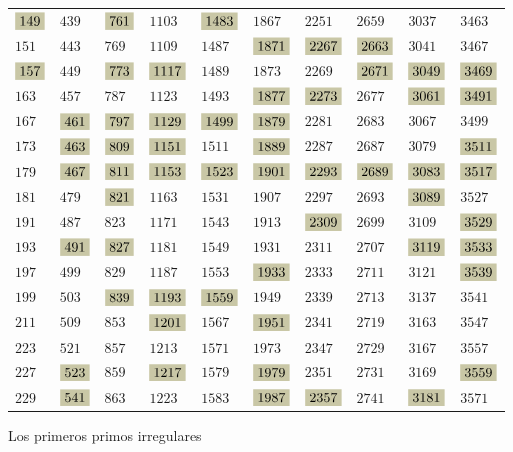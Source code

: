 \documentclass{article}
\newcommand{\highlight}[1]{\colorbox{shadecolor}{$\displaystyle #1$}}
\begin{document}
\begin{center}
{\begin{tabular}{x{1cm}x{1cm}x{1cm}x{1cm}x{1cm}x{1cm}x{1cm}x{1cm}x{1cm}x{1cm}}
$\highlight{149}$ & $439$ & $\highlight{761}$ & $1103$ & $\highlight{1483}$ & $1867$ & $2251$ & $2659$ & $3037$ & $3463$ \tabularnewline
$151$ & $443$ & $769$ & $1109$ & $1487$ & $\highlight{1871}$ & $\highlight{2267}$ & $\highlight{2663}$ & $3041$ & $3467$ \tabularnewline
$\highlight{157}$ & $449$ & $\highlight{773}$ & $\highlight{1117}$ & $1489$ & $1873$ & $2269$ & $\highlight{2671}$ & $\highlight{3049}$ & $\highlight{3469}$ \tabularnewline
$163$ & $457$ & $787$ & $1123$ & $1493$ & $\highlight{1877}$ & $\highlight{2273}$ & $2677$ & $\highlight{3061}$ & $\highlight{3491}$ \tabularnewline
$167$ & $\highlight{461}$ & $\highlight{797}$ & $\highlight{1129}$ & $\highlight{1499}$ & $\highlight{1879}$ & $2281$ & $2683$ & $3067$ & $3499$ \tabularnewline
$173$ & $\highlight{463}$ & $\highlight{809}$ & $\highlight{1151}$ & $1511$ & $\highlight{1889}$ & $2287$ & $2687$ & $3079$ & $\highlight{3511}$ \tabularnewline
$179$ & $\highlight{467}$ & $\highlight{811}$ & $\highlight{1153}$ & $\highlight{1523}$ & $\highlight{1901}$ & $\highlight{2293}$ & $\highlight{2689}$ & $\highlight{3083}$ & $\highlight{3517}$ \tabularnewline
$181$ & $479$ & $\highlight{821}$ & $1163$ & $1531$ & $1907$ & $2297$ & $2693$ & $\highlight{3089}$ & $3527$ \tabularnewline
$191$ & $487$ & $823$ & $1171$ & $1543$ & $1913$ & $\highlight{2309}$ & $2699$ & $3109$ & $\highlight{3529}$ \tabularnewline
$193$ & $\highlight{491}$ & $\highlight{827}$ & $1181$ & $1549$ & $1931$ & $2311$ & $2707$ & $\highlight{3119}$ & $\highlight{3533}$ \tabularnewline
$197$ & $499$ & $829$ & $1187$ & $1553$ & $\highlight{1933}$ & $2333$ & $2711$ & $3121$ & $\highlight{3539}$ \tabularnewline
$199$ & $503$ & $\highlight{839}$ & $\highlight{1193}$ & $\highlight{1559}$ & $1949$ & $2339$ & $2713$ & $3137$ & $3541$ \tabularnewline
$211$ & $509$ & $853$ & $\highlight{1201}$ & $1567$ & $\highlight{1951}$ & $2341$ & $2719$ & $3163$ & $3547$ \tabularnewline
$223$ & $521$ & $857$ & $1213$ & $1571$ & $1973$ & $2347$ & $2729$ & $3167$ & $3557$ \tabularnewline
$227$ & $\highlight{523}$ & $859$ & $\highlight{1217}$ & $1579$ & $\highlight{1979}$ & $2351$ & $2731$ & $3169$ & $\highlight{3559}$ \tabularnewline
$229$ & $\highlight{541}$ & $863$ & $1223$ & $1583$ & $\highlight{1987}$ & $\highlight{2357}$ & $2741$ & $\highlight{3181}$ & $3571$ \tabularnewline
\end{tabular}}

\vspace{1em}

Los primeros primos irregulares
\end{center}
\end{document}
